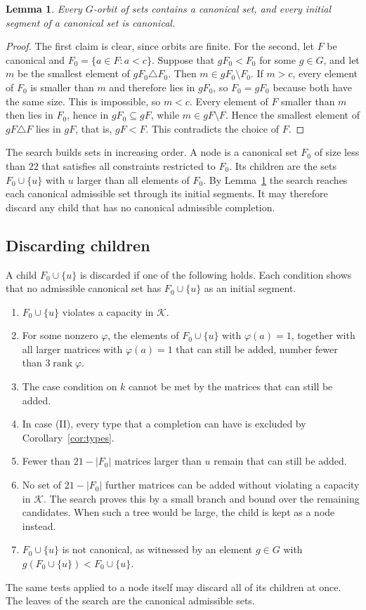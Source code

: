 \documentclass[11pt]{amsart}
\newtheorem{lemma}[theorem]{Lemma}
\theoremstyle{definition}
\theoremstyle{remark}
\numberwithin{equation}{section}
\newcommand{\rk}{\operatorname{rank}}
\newcommand{\cK}{\mathcal{K}}
\begin{document}
\begin{lemma}\label{lem:canon}
Every $G$-orbit of sets contains a canonical set, and every initial segment of a canonical set is canonical.
\end{lemma}

\begin{proof}
The first claim is clear, since orbits are finite. For the second, let $F$ be canonical and $F_0=\{a\in F:a<c\}$. Suppose that $gF_0<F_0$ for some $g\in G$, and let $m$ be the smallest element of $gF_0\triangle F_0$. Then $m\in gF_0\setminus F_0$. If $m>c$, every element of $F_0$ is smaller than $m$ and therefore lies in $gF_0$, so $F_0=gF_0$ because both have the same size. This is impossible, so $m<c$. Every element of $F$ smaller than $m$ then lies in $F_0$, hence in $gF_0\subseteq gF$, while $m\in gF\setminus F$. Hence the smallest element of $gF\triangle F$ lies in $gF$, that is, $gF<F$. This contradicts the choice of $F$.
\end{proof}

The search builds sets in increasing order. A node is a canonical set $F_0$ of size less than $22$ that satisfies all constraints restricted to $F_0$. Its children are the sets $F_0\cup\{u\}$ with $u$ larger than all elements of $F_0$. By Lemma~\ref{lem:canon} the search reaches each canonical admissible set through its initial segments. It may therefore discard any child that has no canonical admissible completion.

\subsection{Discarding children}
A child $F_0\cup\{u\}$ is discarded if one of the following holds. Each condition shows that no admissible canonical set has $F_0\cup\{u\}$ as an initial segment.
\begin{enumerate}[label=(\roman*)]
\item $F_0\cup\{u\}$ violates a capacity in $\cK$.
\item For some nonzero $\varphi$, the elements of $F_0\cup\{u\}$ with $\varphi(a)=1$, together with all larger matrices with $\varphi(a)=1$ that can still be added, number fewer than $3\rk\varphi$.
\item The case condition on $k$ cannot be met by the matrices that can still be added.
\item In case (II), every type that a completion can have is excluded by Corollary~\ref{cor:types}.
\item Fewer than $21-|F_0|$ matrices larger than $u$ remain that can still be added.
\item No set of $21-|F_0|$ further matrices can be added without violating a capacity in $\cK$. The search proves this by a small branch and bound over the remaining candidates. When such a tree would be large, the child is kept as a node instead.
\item $F_0\cup\{u\}$ is not canonical, as witnessed by an element $g\in G$ with $g(F_0\cup\{u\})<F_0\cup\{u\}$.
\end{enumerate}
The same tests applied to a node itself may discard all of its children at once. The leaves of the search are the canonical admissible sets.
\end{document}
